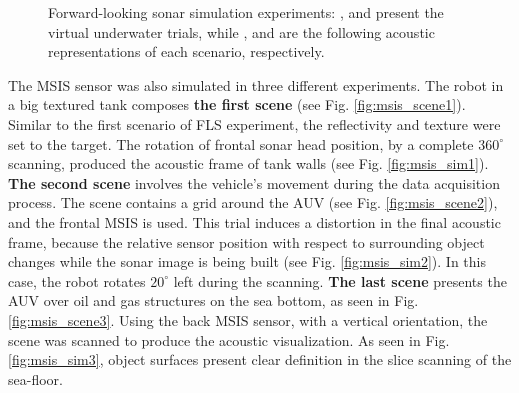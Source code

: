 \documentclass[final,5p,times]{elsarticle}
\begin{document}
\begin{figure}[!ht]
{        \label{fig:fls_sim2}
    }
    \captionsetup{justification=centering}
    \caption{Forward-looking sonar simulation experiments: ,  and  present the virtual underwater trials, while ,  and  are the following acoustic representations of each scenario, respectively.}
    \label{fig:fls}
\end{figure}

The MSIS sensor was also simulated in three different experiments. The robot in a big textured tank composes \textbf{the first scene} (see Fig. \ref{fig:msis_scene1}). Similar to the first scenario of FLS experiment, the reflectivity and texture were set to the target. The rotation of frontal sonar head position, by a complete $360^{\circ}$ scanning, produced the acoustic frame of tank walls (see Fig. \ref{fig:msis_sim1}). \textbf{The second scene} involves the vehicle's movement during the data acquisition process. The scene contains a grid around the AUV (see Fig. \ref{fig:msis_scene2}), and the frontal MSIS is used. This trial induces a distortion in the final acoustic frame, because the relative sensor position with respect to surrounding object changes while the sonar image is being built (see Fig. \ref{fig:msis_sim2}). In this case, the robot rotates $20^{\circ}$ left during the scanning. \textbf{The last scene} presents the AUV over oil and gas structures on the sea bottom, as seen in Fig. \ref{fig:msis_scene3}. Using the back MSIS sensor, with a vertical orientation, the scene was scanned to produce the acoustic visualization. As seen in Fig. \ref{fig:msis_sim3}, object surfaces present clear definition in the slice scanning of the sea-floor.
\end{document}
